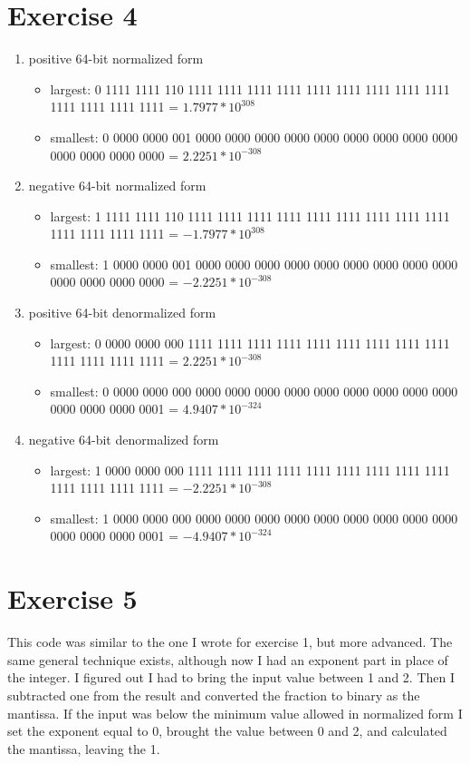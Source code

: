 \documentclass{article}
\begin{document}
\section{Exercise 4}
\begin{enumerate}
    \item positive 64-bit normalized form
    \begin{itemize}
        \item largest: 0 1111 1111 110 1111 1111 1111 1111 1111 1111 1111 1111 1111 1111 1111 1111 1111 = $1.7977*10^{308}$
        \item smallest: 0 0000 0000 001 0000 0000 0000 0000 0000 0000 0000 0000 0000 0000 0000 0000 0000 = $2.2251*10^{-308}$
    \end{itemize}
    \item negative 64-bit normalized form
    \begin{itemize}
        \item largest: 1 1111 1111 110 1111 1111 1111 1111 1111 1111 1111 1111 1111 1111 1111 1111 1111 = $-1.7977*10^{308}$
        \item smallest: 1 0000 0000 001 0000 0000 0000 0000 0000 0000 0000 0000 0000 0000 0000 0000 0000 =  $-2.2251*10^{-308}$
    \end{itemize}
    \item positive 64-bit denormalized form
    \begin{itemize}
        \item largest: 0 0000 0000 000 1111 1111 1111 1111 1111 1111 1111 1111 1111 1111 1111 1111 1111 = $2.2251*10^{-308}$
        \item smallest: 0 0000 0000 000 0000 0000 0000 0000 0000 0000 0000 0000 0000 0000 0000 0000 0001 =  $4.9407*10^{-324}$
    \end{itemize}
    \item negative 64-bit denormalized form
    \begin{itemize}
        \item largest: 1 0000 0000 000 1111 1111 1111 1111 1111 1111 1111 1111 1111 1111 1111 1111 1111 = $-2.2251*10^{-308}$
        \item smallest: 1 0000 0000 000 0000 0000 0000 0000 0000 0000 0000 0000 0000 0000 0000 0000 0001 = $-4.9407*10^{-324}$ 
    \end{itemize}
\end{enumerate}

\section{Exercise 5}
This code was similar to the one I wrote for exercise 1, but more advanced. The same general technique exists, although now I had an exponent part in place of the integer. I figured out I had to bring the input value between 1 and 2. Then I subtracted one from the result and converted the fraction to binary as the mantissa. If the input was below the minimum value allowed in normalized form I set the exponent equal to 0, brought the value between 0 and 2, and calculated the mantissa, leaving the 1.
\end{document}
